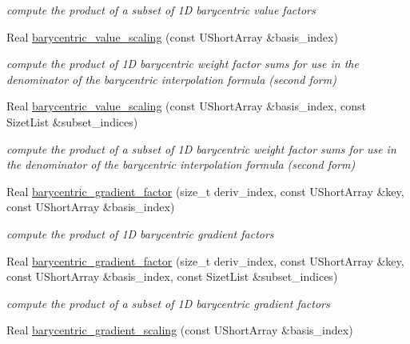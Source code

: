 \begin{DoxyCompactItemize}
\begin{DoxyCompactList}\small\item\em compute the product of a subset of 1D barycentric value factors \end{DoxyCompactList}\item 
Real \hyperlink{classPecos_1_1SharedInterpPolyApproxData_a60684969aa472abd213e746cc95e1b3e}{barycentric\+\_\+value\+\_\+scaling} (const U\+Short\+Array \&basis\+\_\+index)\label{classPecos_1_1SharedInterpPolyApproxData_a60684969aa472abd213e746cc95e1b3e}

\begin{DoxyCompactList}\small\item\em compute the product of 1D barycentric weight factor sums for use in the denominator of the barycentric interpolation formula (second form) \end{DoxyCompactList}\item 
Real \hyperlink{classPecos_1_1SharedInterpPolyApproxData_aebfe4bd53cc5e7eb34efd7efb7aa07e6}{barycentric\+\_\+value\+\_\+scaling} (const U\+Short\+Array \&basis\+\_\+index, const Sizet\+List \&subset\+\_\+indices)\label{classPecos_1_1SharedInterpPolyApproxData_aebfe4bd53cc5e7eb34efd7efb7aa07e6}

\begin{DoxyCompactList}\small\item\em compute the product of a subset of 1D barycentric weight factor sums for use in the denominator of the barycentric interpolation formula (second form) \end{DoxyCompactList}\item 
Real \hyperlink{classPecos_1_1SharedInterpPolyApproxData_a268c12abc76f46fec2d5503cc165acc6}{barycentric\+\_\+gradient\+\_\+factor} (size\+\_\+t deriv\+\_\+index, const U\+Short\+Array \&key, const U\+Short\+Array \&basis\+\_\+index)\label{classPecos_1_1SharedInterpPolyApproxData_a268c12abc76f46fec2d5503cc165acc6}

\begin{DoxyCompactList}\small\item\em compute the product of 1D barycentric gradient factors \end{DoxyCompactList}\item 
Real \hyperlink{classPecos_1_1SharedInterpPolyApproxData_a103b2fbb180aa1503e33b0042d6df0c9}{barycentric\+\_\+gradient\+\_\+factor} (size\+\_\+t deriv\+\_\+index, const U\+Short\+Array \&key, const U\+Short\+Array \&basis\+\_\+index, const Sizet\+List \&subset\+\_\+indices)
\begin{DoxyCompactList}\small\item\em compute the product of a subset of 1D barycentric gradient factors \end{DoxyCompactList}\item 
Real \hyperlink{classPecos_1_1SharedInterpPolyApproxData_a74259549a81c3c749048e7e4897f53e2}{barycentric\+\_\+gradient\+\_\+scaling} (const U\+Short\+Array \&basis\+\_\+index)\label{classPecos_1_1SharedInterpPolyApproxData_a74259549a81c3c749048e7e4897f53e2}


\end{DoxyCompactItemize}
